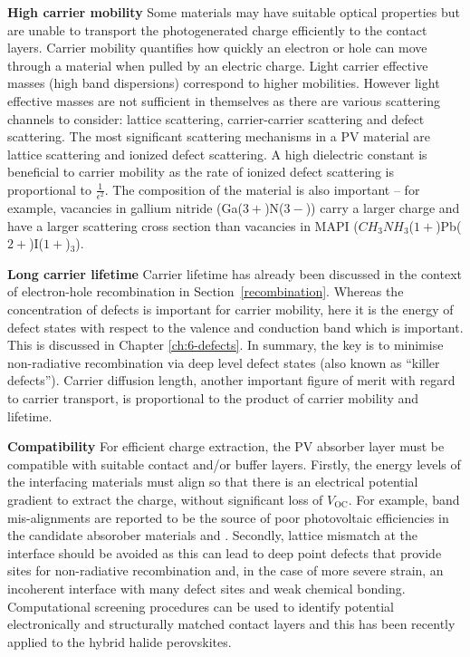 \newline
\textbf{High carrier mobility}\newline
Some materials may have suitable optical properties but are unable to transport the photogenerated charge efficiently to the contact layers. Carrier mobility quantifies how quickly an electron or hole can move through a material when pulled by an electric charge. 
Light carrier effective masses (high band dispersions) correspond to higher mobilities. However light effective masses are not sufficient in themselves as there are various scattering channels to consider: lattice scattering, carrier-carrier scattering and defect scattering. The most significant scattering mechanisms in a PV material are lattice scattering and ionized defect scattering.
A high dielectric constant is beneficial to carrier mobility as the rate of ionized defect scattering is proportional to $\frac{1}{\epsilon^2}$. The composition of the material is also important -- for example, vacancies in gallium nitride (Ga($3+$)N($3-$)) carry a larger charge and have a larger scattering cross section than vacancies in MAPI ($CH_3NH_3$($1+$)Pb($2+$)I($1+$)$_3$).

\newline
\textbf{Long carrier lifetime}\newline
Carrier lifetime has already been discussed in the context of electron-hole recombination in Section\ \ref{recombination}. Whereas the concentration of defects is important for carrier mobility, here it is the energy of defect states with respect to the valence and conduction band which is important. This is discussed in Chapter \ref{ch:6-defects}. In summary, the key is to minimise non-radiative recombination via deep level defect states (also known as ``killer defects''). Carrier diffusion length, another important figure of merit with regard to carrier transport, is proportional to the product of carrier mobility and lifetime.

\newline
\textbf{Compatibility}\newline
For efficient charge extraction, the PV absorber layer must be compatible with suitable contact and/or buffer layers. Firstly, the energy levels of the interfacing materials must align so that there is an electrical potential gradient to extract the charge, without significant loss of $V_\textrm{OC}$. For example, band mis-alignments are reported to be the source of poor photovoltaic efficiencies in the candidate absorober materials  and .\autocite{Ganose2016} Secondly, lattice mismatch at the interface should be avoided as this can lead to deep point defects that provide sites for non-radiative recombination and, in the case of more severe strain, an incoherent interface with many defect sites and weak chemical bonding. Computational screening procedures can be used to identify potential electronically and structurally matched contact layers and this has been recently applied to the hybrid halide perovskites.\autocite{Butler2016}

